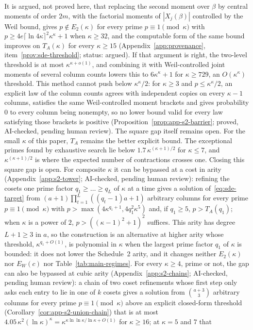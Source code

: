 \begin{remark}
\label{rem:two-level-threshold-size}
It is argued, not proved here, that replacing the second moment over $\beta$ by central moments of order $2m$, with the factorial moments of $|X_j(\beta)|$ controlled by the Weil bound, gives $p \notin E_2(\kappa)$ for every prime $p \equiv 1 \pmod\kappa$ with $p \ge 4e\lceil\ln 4\kappa\rceil^2\kappa^\kappa + 1$ when $\kappa \ge 32$, and the computable form of the same bound improves on $T_A(\kappa)$ for every $\kappa \ge 15$ (Appendix~\ref{app:provenance}, item~\ref{prov:sde-threshold}; status: argued). If that argument is right, the two-level threshold is at most $\kappa^{\kappa+o(1)}$, and combining it with Weil-controlled joint moments of several column counts lowers this to $6\kappa^\kappa + 1$ for $\kappa \ge 729$, an $O(\kappa^\kappa)$ threshold. This method cannot push below $\kappa^\kappa/2$: for $\kappa \ge 3$ and $p \le \kappa^\kappa/2$, an explicit law of the column counts agrees with independent copies on every $\kappa-1$ columns, satisfies the same Weil-controlled moment brackets and gives probability $0$ to every column being nonempty, so no lower bound valid for every law satisfying those brackets is positive (Proposition~\ref{prop:app-s2-barrier}; proved, AI-checked, pending human review). The square gap itself remains open. For the small $\kappa$ of this paper, $T_A$ remains the better explicit bound. The exceptional primes found by exhaustive search lie below $1.7\,\kappa^{(\kappa+1)/2}$ for $\kappa \le 7$, and $\kappa^{(\kappa+1)/2}$ is where the expected number of contractions crosses one. Closing this square gap is open. For composite $\kappa$ it can be bypassed at a cost in arity (Appendix~\ref{app:s2-tower}; AI-checked, pending human review): refining the cosets one prime factor $q_1 \ge \dots \ge q_L$ of $\kappa$ at a time gives a solution of~\eqref{eq:sde-target} from $(a+1)\prod_{t=1}^{L}((q_t-1)a+1)$ arbitrary columns for every prime $p \equiv 1 \pmod\kappa$ with $p > \max(4\kappa^{q_1+1}, 4q_1^2\kappa^5)$ and, if $q_1 \ge 5$, $p > T_A(q_1)$; when $\kappa$ is a power of $2$, $p > ((\kappa-1)^2+1)^2$ suffices. This arity has degree $L+1 \ge 3$ in $a$, so the construction is an alternative at higher arity whose threshold, $\kappa^{q_1+O(1)}$, is polynomial in $\kappa$ when the largest prime factor $q_1$ of $\kappa$ is bounded: it does not lower the Schedule~2 arity, and it changes neither $E_2(\kappa)$ nor $E_W(c)$ nor Table~\ref{tab:main-regimes}. For every $\kappa \ge 4$, prime or not, the gap can also be bypassed at cubic arity (Appendix~\ref{app:s2-chains}; AI-checked, pending human review): a chain of two coset refinements whose first step only asks each entry to lie in one of $k$ cosets gives a solution from $\binom{a+3}{3}$ arbitrary columns for every prime $p \equiv 1 \pmod\kappa$ above an explicit closed-form threshold (Corollary~\ref{cor:app-s2-union-chain}) that is at most $4.05\,\kappa^2(\ln\kappa)^\kappa = \kappa^{\kappa\ln\ln\kappa/\ln\kappa+O(1)}$ for $\kappa \ge 16$; at $\kappa = 5$ and $7$ that 
\end{remark}
